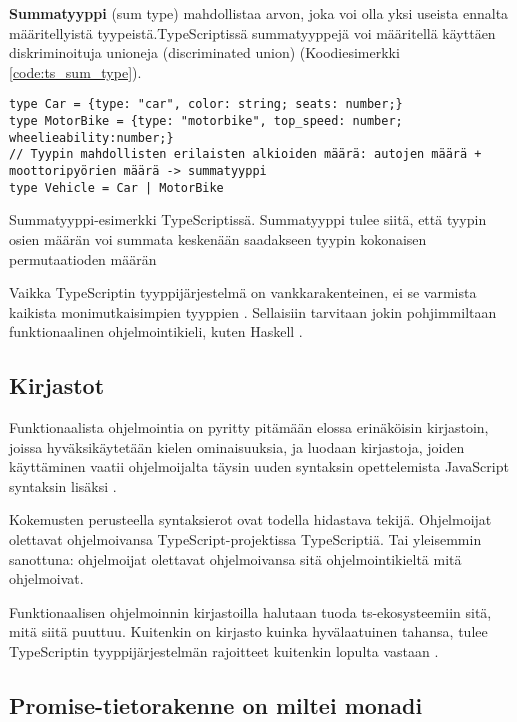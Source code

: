 \textbf{Summatyyppi} (sum type) mahdollistaa arvon, joka voi olla yksi useista ennalta määritellyistä tyypeistä.TypeScriptissä summatyyppejä voi määritellä käyttäen diskriminoituja unioneja (discriminated union) (Koodiesimerkki \ref{code:ts_sum_type}). \citep{algebraic_data_types,holvikari2021category}

\begin{code}
    \begin{verbatim}
type Car = {type: "car", color: string; seats: number;}
type MotorBike = {type: "motorbike", top_speed: number; wheelieability:number;}
// Tyypin mahdollisten erilaisten alkioiden määrä: autojen määrä + moottoripyörien määrä -> summatyyppi
type Vehicle = Car | MotorBike
\end{verbatim}
    \caption{Summatyyppi-esimerkki TypeScriptissä. Summatyyppi tulee siitä, että tyypin osien määrän voi summata keskenään saadakseen tyypin kokonaisen permutaatioden määrän}
    \label{code:ts_sum_type}
\end{code}


Vaikka TypeScriptin tyyppijärjestelmä on vankkarakenteinen, ei se varmista kaikista monimutkaisimpien tyyppien  \cite{holvikari2021category}. Sellaisiin tarvitaan jokin pohjimmiltaan funktionaalinen ohjelmointikieli, kuten Haskell \cite{holvikari2021category}.

\subsection{Kirjastot}

Funktionaalista ohjelmointia on pyritty pitämään elossa erinäköisin kirjastoin, joissa hyväksikäytetään kielen ominaisuuksia, ja luodaan kirjastoja, joiden käyttäminen vaatii ohjelmoijalta täysin uuden syntaksin opettelemista JavaScript syntaksin lisäksi \cite{ramda,sanctuary,crocks,fpts,holvikari2021category}.

Kokemusten perusteella syntaksierot ovat todella hidastava tekijä. Ohjelmoijat olettavat ohjelmoivansa TypeScript-projektissa TypeScriptiä. Tai yleisemmin sanottuna: ohjelmoijat olettavat ohjelmoivansa sitä ohjelmointikieltä mitä ohjelmoivat.

Funktionaalisen ohjelmoinnin kirjastoilla halutaan tuoda \gls{ts}-ekosysteemiin sitä, mitä siitä puuttuu. Kuitenkin on kirjasto kuinka hyvälaatuinen tahansa, tulee TypeScriptin tyyppijärjestelmän rajoitteet kuitenkin lopulta vastaan \cite{holvikari2021category}.

\subsection{Promise-tietorakenne on miltei monadi}

